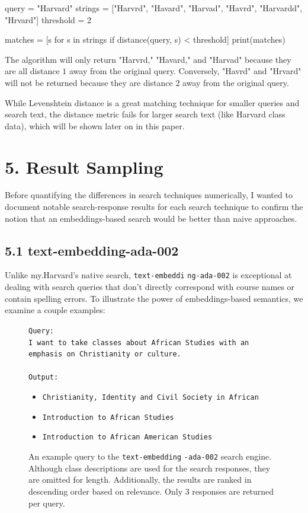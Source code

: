 \documentclass[
	a4paper, %
	10pt, %
	unnumberedsections, %
	twoside, %
]{LTJournalArticle}
\begin{document}
\begin{python}
	query = "Harvard"
	strings = ["Harvrd", "Havard", 
	"Harvad", "Havrd", "Harvardd", "Hrvard"]
	threshold = 2

	matches = [s for s in strings 
	if distance(query, s) < threshold]
	print(matches)
\end{python}

The algorithm will only return "Harvrd," "Havard," and "Harvad" because they are all distance $1$ away from the original query. Conversely, "Havrd" and "Hrvard" will not be returned because they are distance $2$ away from the original query.

While Levenshtein distance is a great matching technique for smaller queries and search text, the distance metric fails for larger search text (like Harvard class data), which will be shown later on in this paper. 

\section{5. Result Sampling}

Before quantifying the differences in search techniques numerically, I wanted to document notable search-response results for each search technique to confirm the notion that an embeddings-based search would be better than naive approaches.

\subsection{5.1 text-embedding-ada-002}

Unlike my.Harvard's native search, \texttt{text-embeddi}
\texttt{ng-ada-002} is exceptional at dealing with search queries that don't directly correspond with course names or contain spelling errors. To illustrate the power of embeddings-based semantics, we examine a couple examples:



\begin{figure}[h]
	\begin{center}
		\texttt{Query:} \\
		\texttt{I want to take classes about African Studies with an emphasis on Christianity or culture.} \\
		\texttt{}\\
		\texttt{Output:} 
		\begin{itemize}
			\item \texttt{Christianity, Identity and Civil Society in African}
			\item \texttt{Introduction to African Studies}
			\item \texttt{Introduction to African American Studies}
		\end{itemize}		
	\end{center}

	\caption{An example query to the \texttt{text-embedding} \texttt{-ada-002} search engine. Although class descriptions are used for the search responses, they are omitted for length. Additionally, the results are ranked in descending order based on relevance. Only 3 responses are returned per query.}
	\label{fig:ex1}
\end{figure}
\end{document}
